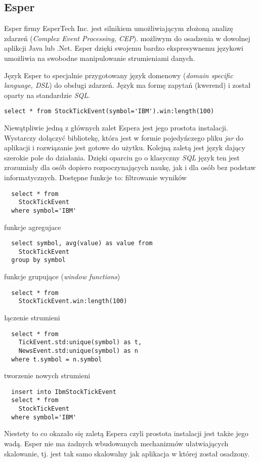 \subsection{Esper}
Esper firmy EsperTech Inc. jest silnikiem umożliwiającym złożoną analizę zdarzeń
(\textit{Complex Event Processing, CEP}).
możliwym do osadzenia w dowolnej aplikcji Java lub .Net.
Esper dzięki swojemu bardzo ekspresywnemu językowi umożliwia na swobodne manipulowanie strumieniami danych.

Język Esper to specjalnie przygotowany język domenowy (\textit{domain specific language, DSL}) do obsługi zdarzeń.
Język ma formę zapytań (kwerend) i został oparty na standardzie \textit{SQL}.

\begin{lstlisting}[captionpos=b, caption=Przykładowe zapytanie w języku Esper]
  select * from StockTickEvent(symbol='IBM').win:length(100)
\end{lstlisting}

Niewątpliwie jedną z głównych zalet Espera jest jego prostota instalacji.
Wystarczy dołączyć bibliotekę,
która jest w formie pojedyńczego pliku \textit{jar}
do aplikacji i rozwiązanie jest gotowe do użytku.
Kolejną zaletą jest język dający szerokie pole do działania.
Dzięki oparciu go o klasyczny \textit{SQL} język ten jest zrozumiały dla osób dopiero rozpoczynających naukę,
jak i dla osób bez podstaw informatycznych.
Dostępne funkcje to:
filtrowanie wyników
\begin{lstlisting}
  select * from
    StockTickEvent
  where symbol='IBM'
\end{lstlisting}
funkcje agregujace
\begin{lstlisting}
  select symbol, avg(value) as value from
    StockTickEvent
  group by symbol
\end{lstlisting}
funkcje grupujące (\textit{window functions})
\begin{lstlisting}
  select * from
    StockTickEvent.win:length(100)
\end{lstlisting}
łączenie strumieni
\begin{lstlisting}
  select * from
    TickEvent.std:unique(symbol) as t,
    NewsEvent.std:unique(symbol) as n
  where t.symbol = n.symbol
\end{lstlisting}
tworzenie nowych strumieni
\begin{lstlisting}
  insert into IbmStockTickEvent
  select * from
    StockTickEvent
  where symbol='IBM'
\end{lstlisting}

Niestety to co okazało się zaletą Espera czyli prostota instalacji
jest także jego wadą.
Esper nie ma żadnych wbudowanych mechanizmów ułatwiających skalowanie,
tj. jest tak samo skalowalny jak aplikacja w której został osadzony.
